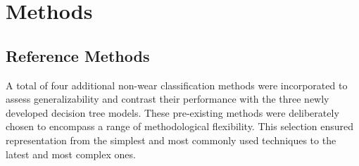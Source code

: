 \documentclass[
  10pt,
]{scrbook}
\begin{document}
\hypertarget{methods-1}{%
\section{Methods}\label{methods-1}}

\hypertarget{reference-methods}{%
\subsection{Reference Methods}\label{reference-methods}}

A total of four additional non-wear classification methods were
incorporated to assess generalizability and contrast their performance
with the three newly developed decision tree models. These pre-existing
methods were deliberately chosen to encompass a range of methodological
flexibility. This selection ensured representation from the simplest and
most commonly used techniques to the latest and most complex ones.
\end{document}
